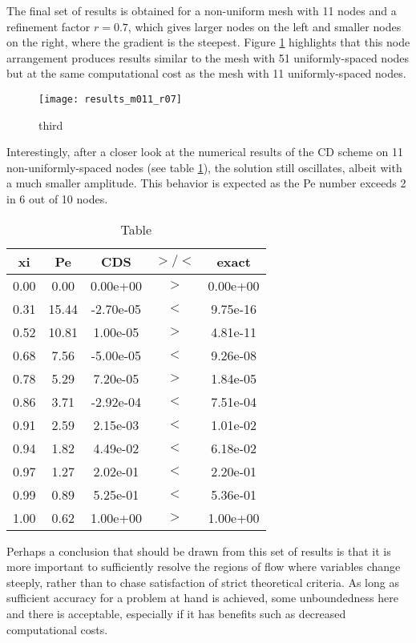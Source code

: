 \documentclass[12pt]{article}
\begin{document}
The final set of results is obtained for a non-uniform mesh with 11 nodes and a refinement factor $r = 0.7$, which gives larger nodes on the left and smaller nodes on the right, where the gradient is the steepest. Figure \ref{fig:third} highlights that this node arrangement produces results similar to the mesh with 51 uniformly-spaced nodes but at the same computational cost as the mesh with 11 uniformly-spaced nodes.

\begin{figure}
    \centering
    \texttt{[image: results\_m011\_r07]}
    \caption{third}
    \label{fig:third}
\end{figure}

Interestingly, after a closer look at the numerical results of the CD scheme on 11 non-uniformly-spaced nodes (see table \ref{tab:my-table}), the solution still oscillates, albeit with a much smaller amplitude. This behavior is expected as the Pe number exceeds 2 in 6 out of 10 nodes.

\begin{table}
    \centering
    \caption{Table}
    \label{tab:my-table}
    \begin{tabular}{ccccc}
    \textbf{xi} & \textbf{Pe} & \textbf{CDS} & \textbf{$>/<$} & \textbf{exact} \\
    \hline
    0.00 &  0.00 &  0.00e+00 & $>$ & 0.00e+00 \\
    0.31 & 15.44 & -2.70e-05 & $<$ & 9.75e-16 \\
    0.52 & 10.81 &  1.00e-05 & $>$ & 4.81e-11 \\
    0.68 &  7.56 & -5.00e-05 & $<$ & 9.26e-08 \\
    0.78 &  5.29 &  7.20e-05 & $>$ & 1.84e-05 \\
    0.86 &  3.71 & -2.92e-04 & $<$ & 7.51e-04 \\
    0.91 &  2.59 &  2.15e-03 & $<$ & 1.01e-02 \\
    0.94 &  1.82 &  4.49e-02 & $<$ & 6.18e-02 \\
    0.97 &  1.27 &  2.02e-01 & $<$ & 2.20e-01 \\
    0.99 &  0.89 &  5.25e-01 & $<$ & 5.36e-01 \\
    1.00 &  0.62 &  1.00e+00 & $>$ & 1.00e+00
    \end{tabular}
\end{table}

Perhaps a conclusion that should be drawn from this set of results is that it is more important to sufficiently resolve the regions of flow where variables change steeply, rather than to chase satisfaction of strict theoretical criteria. As long as sufficient accuracy for a problem at hand is achieved, some unboundedness here and there is acceptable, especially if it has benefits such as decreased computational costs.
\end{document}
